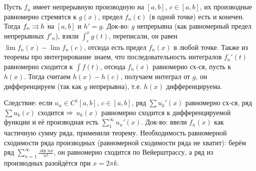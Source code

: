\section{} %
Пусть $f_n$ имеет непрерывную производную на $[a,b]$, $c\in[a,b]$, их производные равномерно стремятся к $g(x)$, предел $f_n(с)$ (в одной точке) есть и конечен.
Тогда $f_n \rightrightarrows h$ на $[a,b]$ и $h'=g$.
Док-во: $g$ непрерывна (как равномерный предел непрерывных $f'_n$), взяли $\int_c^x g(t)$, переписали, он равен $\lim f_n(x) - \lim f_n(c)$, отсюда есть предел $f_n(x)$ в любой точке.
Также из теоремы про интегрирование знаем, что последовательность интегралов $f_n'(t)$ равномерно сходится к $\int f(t)$, отсюда $f_n(x)$ равномерно сх-ся,
пусть к $h(x)$.
Тогда считаем $h(x)-h(c)$, получаем интеграл от $g$, он дифференцируем (так как $g$ непрерывна), т.е. $h(x)$ дифференцируема.

Следствие: если $u_n \in C^1[a, b]$, $c\in[a,b]$, ряд $\sum u_k'(x)$ равномерно сх-ся, ряд $\sum u_k(c)$ сходится $\Rightarrow$ $u_k(x)$ равномерно сходится к дифференцируемой функции
и её производная есть $\sum_1^\infty u_n'(x)$.
Док-во: ввели $f_n(x)$ как частичную сумму ряда, применили теорему.
Необходимость равномерной сходимости ряда производных (равномерной сходимости ряда не хватит): берём ряд $\sum_{n=1}^\infty \frac{\sin nx}{n^2}$, он равномерно сходится по Вейерштрассу,
а ряд из производных разойдётся при $x=2\pi k$.

